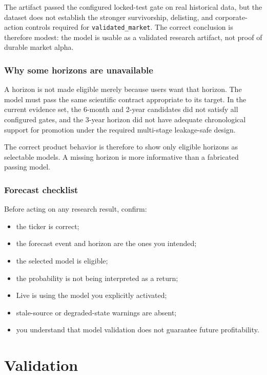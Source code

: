 \documentclass[11pt]{article}
\begin{document}
The artifact passed the configured locked-test gate on real historical data, but the dataset does not establish the stronger survivorship, delisting, and corporate-action controls required for \texttt{validated\_market}. The correct conclusion is therefore modest: the model is usable as a validated research artifact, not proof of durable market alpha.

\section{Why some horizons are unavailable}

A horizon is not made eligible merely because users want that horizon. The model must pass the same scientific contract appropriate to its target. In the current evidence set, the 6-month and 2-year candidates did not satisfy all configured gates, and the 3-year horizon did not have adequate chronological support for promotion under the required multi-stage leakage-safe design.

The correct product behavior is therefore to show only eligible horizons as selectable models. A missing horizon is more informative than a fabricated passing model.

\section{Forecast checklist}

Before acting on any research result, confirm:

\begin{itemize}
\item the ticker is correct;
\item the forecast event and horizon are the ones you intended;
\item the selected model is eligible;
\item the probability is not being interpreted as a return;
\item Live is using the model you explicitly activated;
\item stale-source or degraded-state warnings are absent;
\item you understand that model validation does not guarantee future profitability.
\end{itemize}

\part{Validation}
\end{document}
